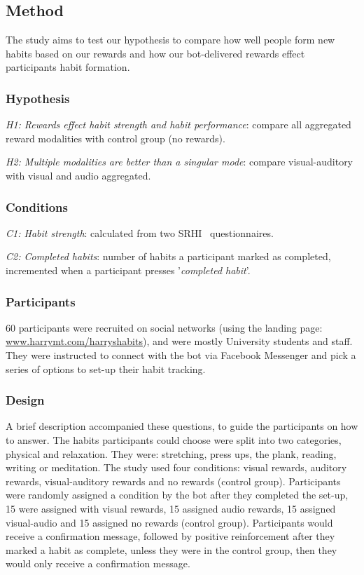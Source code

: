 \documentclass{scaffold/sigchi}
\begin{document}
\subsection{Method}
The study aims to test our hypothesis to compare how well people form new habits based on our rewards  and how our bot-delivered rewards effect participants habit formation.

\subsubsection{Hypothesis}
\textit{H1: Rewards effect habit strength and habit performance}: compare all aggregated reward modalities with control group (no rewards).

\textit{H2: Multiple modalities are better than a singular mode}: compare visual-auditory with visual and audio aggregated.

\subsubsection{Conditions}
\textit{C1: Habit strength}: calculated from two SRHI~\cite{article_habit_measurement} questionnaires.

\textit{C2: Completed habits}: number of habits a participant marked as completed, incremented when a participant presses '\textit{completed habit}'.

\subsubsection{Participants}
60 participants were recruited on social networks (using the landing page: \url{www.harrymt.com/harryshabits}), and were mostly University students and staff. They were instructed to connect with the bot via Facebook Messenger and pick a series of options to set-up their habit tracking.



\subsubsection{Design}
A brief description accompanied these questions, to guide the participants on how to answer. The habits participants could choose were split into two categories, physical and relaxation. They were: stretching, press ups, the plank, reading, writing or meditation.\newline
\newline
The study used four conditions: visual rewards, auditory rewards, visual-auditory rewards and no rewards (control group). Participants were randomly assigned a condition by the bot after they completed the set-up, 15 were assigned with visual rewards, 15 assigned audio rewards, 15 assigned visual-audio and 15 assigned no rewards (control group).\newline
\newline
Participants would receive a confirmation message, followed by positive reinforcement after they marked a habit as complete, unless they were in the control group, then they would only receive a confirmation message.
\end{document}
